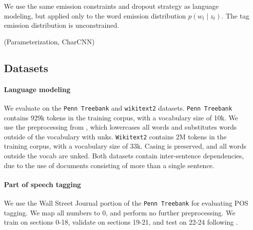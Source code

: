\documentclass[11pt,a4paper]{article}
\begin{document}
We use the same emission constraints and dropout strategy as language modeling,
but applied only to the word emission distribution $p(w_t \mid z_t)$.
The tag emission distribution is unconstrained.

(Parameterization, CharCNN)

\subsection{Datasets}
\paragraph{Language modeling}
We evaluate on the \texttt{Penn Treebank} \citep{ptb}
and \texttt{wikitext2} \citep{wikitext} datasets.
\texttt{Penn Treebank} contains 929k tokens in the training corpus,
with a vocabulary size of 10k.
We use the preprocessing from \citet{mikolov-2011},
which lowercases all words and substitutes words outside of the vocabulary
with unks. 
\texttt{Wikitext2} contains 2M tokens in the training corpus,
with a vocabulary size of 33k.
Casing is preserved, and all words outside the vocab are unked.
Both datasets contain inter-sentence dependencies,
due to the use of documents consisting of more than a single sentence.

\paragraph{Part of speech tagging}
We use the Wall Street Journal portion of the \texttt{Penn Treebank}
for evaluating POS tagging.
We map all numbers to 0, and perform no further preprocessing.
We train on sections 0-18, validate on sections 19-21, and test on 22-24
following \citet{ma2016crf}.


\begin{comment}
\paragraph{Implementation}
We train two-layer LSTM recurrent neural networks with 256 units,
as well as two-layer feed-forward neural networks with 256 units.
The HMMs we train follow the sparsity constraints outlined in the previous
section with a dropout rate of 0.5,
and we vary the total number of states as well as states per word.
We optimize all models with AdamW \citep{adamw}.

We experimented with a couple batching strategies:
On \texttt{Penn Treebank},
the first strategy discarded the inter-sentence dependencies and shuffled all sentences,
and the second treated the corpus as a single flat document without shuffling.
On \texttt{Wikitext2}, we either shuffled at the document level or treated the corpus as a
single document.
Prior work on both corpuses treated the corpora as single documents.

See Appendix \ref{sec:hyperparams} for the hyperparameters for all models.
\end{comment}
\end{document}

